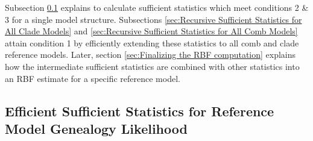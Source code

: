 \documentclass[11pt]{article}
\newcommand{\1}{\mathbbm{1}}
\begin{document}
Subsection \ref{sec:Efficient Sufficient Statistics for Reference Model Genealogy Likelihood} explains to calculate sufficient statistics which meet conditions 2 \& 3 for a single model structure.
%
Subsections \ref{sec:Recursive Sufficient Statistics for All Clade Models} and \ref{sec:Recursive Sufficient Statistics for All Comb Models} attain condition 1 by efficiently extending these statistics to all comb and clade reference models.
%
Later, section \ref{sec:Finalizing the RBF computation} explains how the intermediate sufficient statistics are combined with other statistics into an RBF estimate for a specific reference model.

\subsection{Efficient Sufficient Statistics for Reference Model Genealogy Likelihood}
\label{sec:Efficient Sufficient Statistics for Reference Model Genealogy Likelihood}
\end{document}

